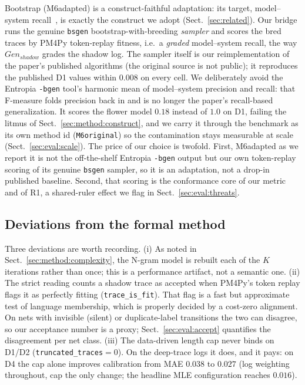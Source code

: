 \documentclass[runningheads]{llncs}
\newcommand{\chg}[1]{\textcolor{chgblue}{#1}}
\newcommand{\genshadow}{\ensuremath{\mathit{Gen}_{\mathit{shadow}}}}
\begin{document}
Bootstrap (M6adapted) is a construct-faithful adaptation: its target, model--system recall~\cite{polyvyanyy2022bootstrap}, is exactly the construct we adopt (Sect.~\ref{sec:related}). Our bridge runs the genuine \texttt{bsgen} bootstrap-with-breeding \emph{sampler} and scores the bred traces by PM4Py token-replay fitness, i.e.\ a \emph{graded} model--system recall, the way \genshadow{} grades the shadow log. \chg{The sampler itself is our reimplementation of the paper's published algorithms (the original source is not public); it reproduces the published D1 values within $0.008$ on every cell.} We deliberately avoid the Entropia \texttt{-bgen} tool's harmonic mean of model--system precision and recall: that F-measure folds precision back in and is no longer the paper's recall-based generalization. It scores the flower model $0.18$ instead of $1.0$ on D1, failing the litmus of Sect.~\ref{sec:method:construct}\chg{, and we carry it through the benchmark as its own method id (\texttt{M6original}) so the contamination stays measurable at scale (Sect.~\ref{sec:eval:scale})}. The price of our choice is twofold. First, M6adapted as we report it is not the off-the-shelf Entropia \texttt{-bgen} output but our own token-replay scoring of its genuine \texttt{bsgen} sampler, so it is an adaptation, not a drop-in published baseline. Second, that scoring is the conformance core of our metric and of R1, a shared-ruler effect we flag in Sect.~\ref{sec:eval:threats}.

\subsection{Deviations from the formal method}
\label{sec:impl:deviations}
Three deviations are worth recording. (i) As noted in Sect.~\ref{sec:method:complexity}, the N-gram model is rebuilt each of the $K$ iterations rather than once; this is a performance artifact, not a semantic one. (ii) The strict reading counts a shadow trace as accepted when PM4Py's token replay flags it as perfectly fitting (\texttt{trace\_is\_fit}). That flag is a fast but approximate test of language membership, which is properly decided by a cost-zero alignment. On nets with invisible (silent) or duplicate-label transitions the two can disagree, so our acceptance number is a proxy\chg{; Sect.~\ref{sec:eval:accept} quantifies the disagreement per net class}. (iii) \chg{The data-driven length cap never binds on D1/D2 (\texttt{truncated\_traces}${=}0$). On the deep-trace logs it does, and it pays: on D4 the cap alone improves calibration from MAE $0.038$ to $0.027$ (log weighting throughout, cap the only change; the headline MLE configuration reaches $0.016$).}
\end{document}
